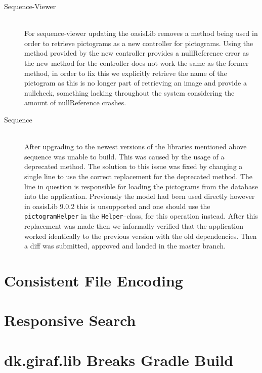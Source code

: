 \begin{description}
    \item[Sequence-Viewer] \hfill \\
    For sequence-viewer updating the oasisLib removes a method being used in order to retrieve pictograms as a new controller for pictograms.
    Using the method provided by the new controller provides a nullReference error as the new method for the controller does not work the same as the former method, in order to fix this we explicitly retrieve the name of the pictogram as this is no longer part of retrieving an image and provide a nullcheck, something lacking throughout the system considering the amount of nullReference crashes.
    \item[Sequence] \hfill \\
    After upgrading to the newest versions of the libraries mentioned above sequence was unable to build. 
    This was caused by the usage of a deprecated method. 
    The solution to this issue was fixed by changing a single line to use the correct replacement for the deprecated method.
    The line in question is responsible for loading the pictograms from the database into the application. 
    Previously the model had been used directly however in oasisLib 9.0.2 this is unsupported and one should use the \texttt{pictogramHelper} in the \texttt{Helper}--class, for this operation instead.
    After this replacement was made then we informally verified that the application worked identically to the previous version with the old dependencies.
    Then a diff was submitted, approved and landed in the master branch. 
\end{description}


\section{Consistent File Encoding}
\section{Responsive Search}

\section{dk.giraf.lib Breaks Gradle Build}
